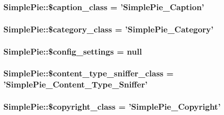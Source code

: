 \hypertarget{class_simple_pie_a9293b34e9b054d7d1bfa7f0ab1e17e55}{
\subsubsection[{\$caption\-\_\-class}]{\setlength{\rightskip}{0pt plus 5cm}Simple\-Pie\-::\$caption\-\_\-class = '{\bf Simple\-Pie\-\_\-\-Caption}'}}\label{class_simple_pie_a9293b34e9b054d7d1bfa7f0ab1e17e55}
\hypertarget{class_simple_pie_a511f03f4cff321a532f12cda469282ec}{
\subsubsection[{\$category\-\_\-class}]{\setlength{\rightskip}{0pt plus 5cm}Simple\-Pie\-::\$category\-\_\-class = '{\bf Simple\-Pie\-\_\-\-Category}'}}\label{class_simple_pie_a511f03f4cff321a532f12cda469282ec}
\hypertarget{class_simple_pie_adc78dd0207cce3867fc182577678fed6}{
\subsubsection[{\$config\-\_\-settings}]{\setlength{\rightskip}{0pt plus 5cm}Simple\-Pie\-::\$config\-\_\-settings = null}}\label{class_simple_pie_adc78dd0207cce3867fc182577678fed6}
\hypertarget{class_simple_pie_aedd80075134cd3af3446b53b2221f09c}{
\subsubsection[{\$content\-\_\-type\-\_\-sniffer\-\_\-class}]{\setlength{\rightskip}{0pt plus 5cm}Simple\-Pie\-::\$content\-\_\-type\-\_\-sniffer\-\_\-class = '{\bf Simple\-Pie\-\_\-\-Content\-\_\-\-Type\-\_\-\-Sniffer}'}}\label{class_simple_pie_aedd80075134cd3af3446b53b2221f09c}
\hypertarget{class_simple_pie_a070ce10f15501097766d543a7090b03c}{
\subsubsection[{\$copyright\-\_\-class}]{\setlength{\rightskip}{0pt plus 5cm}Simple\-Pie\-::\$copyright\-\_\-class = '{\bf Simple\-Pie\-\_\-\-Copyright}'}}\label{class_simple_pie_a070ce10f15501097766d543a7090b03c}
